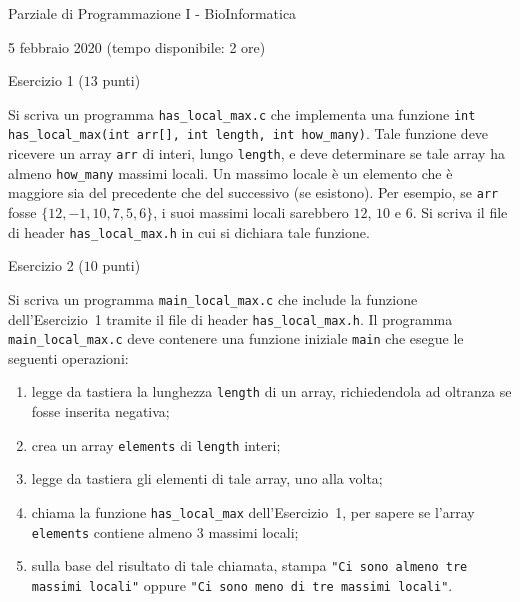\documentclass[12pt]{article}
\begin{document}
\begin{center}{\LARGE Parziale di Programmazione I - BioInformatica}\\
\vspace*{-2ex}
\begin{center}
  \large 5 febbraio 2020 (tempo disponibile: 2 ore)
\end{center}
\end{center}

\vspace*{1ex}
\begin{center}{\Large Esercizio 1} ($13$ punti)\end{center}
Si scriva un programma \texttt{has\_local\_max.c} che implementa una funzione \texttt{int has\_local\_max(int arr[], int length, int how\_many)}. Tale funzione deve ricevere un array \texttt{arr} di interi, lungo \texttt{length}, e deve determinare se tale array ha almeno \texttt{how\_many} massimi locali. Un massimo locale \`e un elemento che \`e maggiore sia del precedente che del successivo (se esistono). Per esempio, se \texttt{arr} fosse $\{12,-1,10,7,5,6\}$, i suoi massimi locali sarebbero $12$, $10$ e $6$. Si scriva il file di header \texttt{has\_local\_max.h} in cui si dichiara tale funzione.

\vspace*{1ex}
\begin{center}{\Large Esercizio 2} ($10$ punti)\end{center}
Si scriva un programma \texttt{main\_local\_max.c} che include la funzione dell'Esercizio~1 tramite
il file di header \texttt{has\_local\_max.h}.
Il programma \texttt{main\_local\_max.c} deve contenere una funzione iniziale \texttt{main} che esegue
le seguenti operazioni:
\begin{enumerate}
\item legge da tastiera la lunghezza \texttt{length} di un array, richiedendola ad oltranza se fosse inserita negativa;
\item crea un array \texttt{elements} di \texttt{length} interi;
\item legge da tastiera gli elementi di tale array, uno alla volta;
\item chiama la funzione \texttt{has\_local\_max} dell'Esercizio~1, per sapere se l'array
  \texttt{elements} contiene almeno $3$ massimi locali;
\item sulla base del risultato di tale chiamata, stampa \texttt{"Ci sono almeno tre massimi locali"}
  oppure \texttt{"Ci sono meno di tre massimi locali"}.
\end{enumerate}
\end{document}
